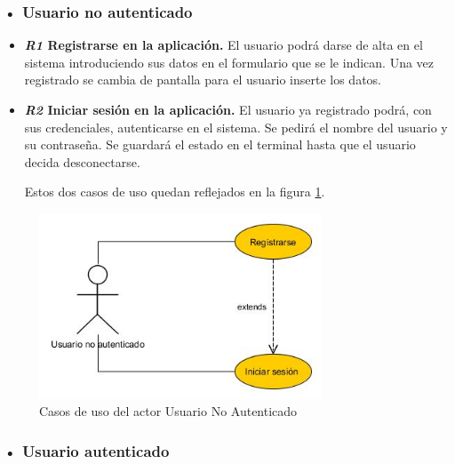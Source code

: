 \subsubsection{• Usuario no autenticado}
\begin{itemize}
\item\textbf{ \textit{R1}  Registrarse en la aplicación.}
 El usuario podrá darse de alta en el sistema
introduciendo sus datos en el formulario que se le indican. Una vez registrado se cambia de pantalla para el usuario inserte los datos.

\item \textbf{\textit{R2} Iniciar sesión en la aplicación. }
El usuario ya registrado podrá, con
sus credenciales, autenticarse en el  sistema. Se pedirá el nombre del usuario y su contraseña. Se guardará el estado en el terminal hasta que el usuario decida desconectarse.

Estos dos casos de uso quedan reflejados en la figura \ref{fig:usuario-no-autenticado}.


\end{itemize} 
\begin{figure}
		\centering
		\includegraphics[width=0.75\textwidth] {usuario-no-autenticado.jpg}
		\caption{Casos de uso del actor Usuario No Autenticado }\label{fig:usuario-no-autenticado}
	\end{figure}
	
	
	
\subsubsection{• Usuario  autenticado}

